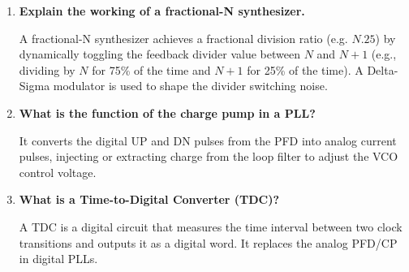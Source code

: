 \documentclass[12pt,a4paper]{article}
\newcommand{\Q}[1]{\textbf{#1}\par\noindent\ignorespaces}
\begin{document}
\begin{tcolorbox}[exambox, title={\textbf{Frequently Asked / Viva Questions}}]
\begin{enumerate}[topsep=0pt, label=\textbf{Q\arabic*.}, itemsep=5pt]
  \item \Q{Explain the working of a fractional-N synthesizer.}
    A fractional-N synthesizer achieves a fractional division ratio (e.g. $N.25$) by dynamically toggling the feedback divider value between $N$ and $N+1$ (e.g., dividing by $N$ for 75\% of the time and $N+1$ for 25\% of the time). A Delta-Sigma modulator is used to shape the divider switching noise.
  \item \Q{What is the function of the charge pump in a PLL?}
    It converts the digital UP and DN pulses from the PFD into analog current pulses, injecting or extracting charge from the loop filter to adjust the VCO control voltage.
  \item \Q{What is a Time-to-Digital Converter (TDC)?}
    A TDC is a digital circuit that measures the time interval between two clock transitions and outputs it as a digital word. It replaces the analog PFD/CP in digital PLLs.
\end{enumerate}
\end{tcolorbox}
\end{document}
